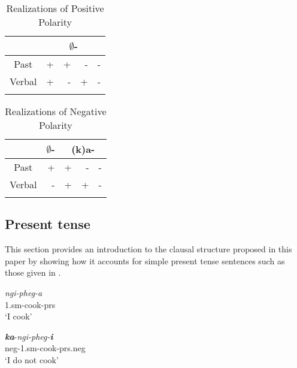 \documentclass[output=paper]{langsci/langscibook}
\begin{document}
\begin{table}
\caption{Realizations of Positive Polarity} %
\centering %
\begin{tabular}{c| rrrr} %
\lsptoprule%
  &\multicolumn{4}{c}{$\emptyset$-} \\ [0.5ex] 
\midrule%
Past & + & + & - & -\\ %
Verbal & + & - & +& -\\[1ex] %
\lspbottomrule%
\end{tabular} 
\label{tab:burkholder:1}
\end{table} 

\begin{table}
\caption{Realizations of Negative Polarity} %
\centering %
\begin{tabular}{c| r|rrr} %
\lsptoprule%
 &\multicolumn{1}{c}{$\emptyset$-} &\multicolumn{3}{|c}{(k)a-} \\ [0.5ex] 
\midrule%
Past & + & + & - & -\\ %
Verbal & - & + & +& -\\[1ex] %
\lspbottomrule%
\end{tabular} 
\label{tab:burkholder:2}
\end{table} 






\subsection{Present tense}\label{sec:burkholder:2.2}

This section provides an introduction to the clausal structure proposed in this paper by showing how it accounts for simple present tense sentences such as those given in .
 

\begin{exe}
\ex\label{ex:burkholder:4}  
\begin{xlist}
\ex\label{ex:burkholder:4a} 
\gll  \textit{ngi-pheg-a}\\
          1.{\sc sm}-cook-\sc prs\\
    \glt `I cook'

\ex\label{ex:burkholder:4b}  
\gll  \textit{\textbf{ka}}-\textit{ngi-pheg-\textbf{i}}\\
          {\sc neg}-1.{\sc sm}-cook-{\sc prs.neg}\\
    \glt `I do not cook'
\end{xlist}
\end{exe}
 
\end{document}
